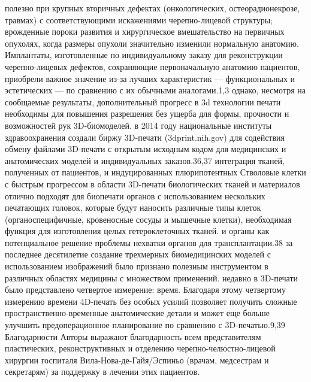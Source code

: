 полезно при крупных вторичных дефектах (онкологических, остеорадионекрозе,
травмах) с соответствующими искажениями черепно-лицевой структуры; врожденные
пороки развития и хирургическое вмешательство на первичных опухолях, когда
размеры опухоли значительно изменили нормальную анатомию. Имплантаты,
изготовленные по индивидуальному заказу для реконструкции черепно-лицевых
дефектов, сохраняющие первоначальную анатомию пациентов, приобрели важное
значение из-за лучших характеристик — функциональных и эстетических — по
сравнению с их обычными аналогами.1,3 однако, несмотря на сообщаемые результаты,
дополнительный прогресс в 3d технологии печати необходимы для повышения
разрешения без ущерба для формы, прочности и возможностей рук 3D-биомоделей. в
2014 году национальные институты здравоохранения создали биржу 3D-печати
(3dprint.nih.gov) для содействия обмену файлами 3D-печати с открытым исходным
кодом для медицинских и анатомических моделей и индивидуальных заказов.36,37
интеграция тканей, полученных от пациентов, и индуцированных плюрипотентных
Стволовые клетки с быстрым прогрессом в области 3D-печати биологических тканей и
материалов отлично подходят для биопечати органов с использованием нескольких
печатающих головок, которые будут наносить различные типы клеток
(органоспецифичные, кровеносные сосуды и мышечные клетки), необходимая функция
для изготовления целых гетероклеточных тканей. и органы как потенциальное
решение проблемы нехватки органов для трансплантации.38 за последнее десятилетие
создание трехмерных биомедицинских моделей с использованием изображений было
признано полезным инструментом в различных областях медицины с множеством
применений. недавно в 3D-печати было представлено четвертое измерение: время.
Благодаря этому четвертому измерению времени 4D-печать без особых усилий
позволяет получить сложные пространственно-временные анатомические детали и
может еще больше улучшить предоперационное планирование по сравнению с
3D-печатью.9,39 Благодарности Авторы выражают благодарность всем представителям
пластических, реконструктивных и отделению черепно-челюстно-лицевой хирургии
госпиталя Вила-Нова-де-Гайя/Эспиньо (врачам, медсестрам и секретарям) за
поддержку в лечении этих пациентов.
